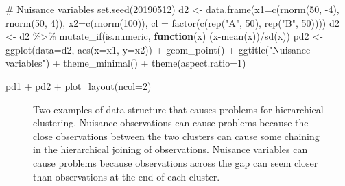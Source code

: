 \documentclass[
  letterpaper,
]{krantz}
\newenvironment{Shaded}{\begin{snugshade}}{\end{snugshade}}
\newcommand{\AttributeTok}[1]{\textcolor[rgb]{0.40,0.45,0.13}{#1}}
\newcommand{\CommentTok}[1]{\textcolor[rgb]{0.37,0.37,0.37}{#1}}
\newcommand{\ControlFlowTok}[1]{\textcolor[rgb]{0.00,0.23,0.31}{\textbf{#1}}}
\newcommand{\DecValTok}[1]{\textcolor[rgb]{0.68,0.00,0.00}{#1}}
\newcommand{\FunctionTok}[1]{\textcolor[rgb]{0.28,0.35,0.67}{#1}}
\newcommand{\NormalTok}[1]{\textcolor[rgb]{0.00,0.23,0.31}{#1}}
\newcommand{\OtherTok}[1]{\textcolor[rgb]{0.00,0.23,0.31}{#1}}
\newcommand{\SpecialCharTok}[1]{\textcolor[rgb]{0.37,0.37,0.37}{#1}}
\newcommand{\StringTok}[1]{\textcolor[rgb]{0.13,0.47,0.30}{#1}}
\begin{document}
\begin{Shaded}
\begin{Highlighting}[]
\CommentTok{\# Nuisance variables}
\FunctionTok{set.seed}\NormalTok{(}\DecValTok{20190512}\NormalTok{)}
\NormalTok{d2 }\OtherTok{\textless{}{-}} \FunctionTok{data.frame}\NormalTok{(}\AttributeTok{x1=}\FunctionTok{c}\NormalTok{(}\FunctionTok{rnorm}\NormalTok{(}\DecValTok{50}\NormalTok{, }\SpecialCharTok{{-}}\DecValTok{4}\NormalTok{), }
                            \FunctionTok{rnorm}\NormalTok{(}\DecValTok{50}\NormalTok{, }\DecValTok{4}\NormalTok{)),}
                 \AttributeTok{x2=}\FunctionTok{c}\NormalTok{(}\FunctionTok{rnorm}\NormalTok{(}\DecValTok{100}\NormalTok{)),}
                 \AttributeTok{cl =} \FunctionTok{factor}\NormalTok{(}\FunctionTok{c}\NormalTok{(}\FunctionTok{rep}\NormalTok{(}\StringTok{"A"}\NormalTok{, }\DecValTok{50}\NormalTok{), }
                             \FunctionTok{rep}\NormalTok{(}\StringTok{"B"}\NormalTok{, }\DecValTok{50}\NormalTok{))))}
\NormalTok{d2 }\OtherTok{\textless{}{-}}\NormalTok{ d2 }\SpecialCharTok{\%\textgreater{}\%} 
  \FunctionTok{mutate\_if}\NormalTok{(is.numeric, }\ControlFlowTok{function}\NormalTok{(x) (x}\SpecialCharTok{{-}}\FunctionTok{mean}\NormalTok{(x))}\SpecialCharTok{/}\FunctionTok{sd}\NormalTok{(x))}
\NormalTok{pd2 }\OtherTok{\textless{}{-}} \FunctionTok{ggplot}\NormalTok{(}\AttributeTok{data=}\NormalTok{d2, }\FunctionTok{aes}\NormalTok{(}\AttributeTok{x=}\NormalTok{x1, }\AttributeTok{y=}\NormalTok{x2)) }\SpecialCharTok{+} 
  \FunctionTok{geom\_point}\NormalTok{() }\SpecialCharTok{+}
    \FunctionTok{ggtitle}\NormalTok{(}\StringTok{"Nuisance variables"}\NormalTok{) }\SpecialCharTok{+} 
  \FunctionTok{theme\_minimal}\NormalTok{() }\SpecialCharTok{+}
    \FunctionTok{theme}\NormalTok{(}\AttributeTok{aspect.ratio=}\DecValTok{1}\NormalTok{)}

\NormalTok{pd1 }\SpecialCharTok{+}\NormalTok{ pd2 }\SpecialCharTok{+} \FunctionTok{plot\_layout}\NormalTok{(}\AttributeTok{ncol=}\DecValTok{2}\NormalTok{)}
\end{Highlighting}
\end{Shaded}

\begin{figure}[H]


\caption{\label{fig-problems}Two examples of data structure that causes
problems for hierarchical clustering. Nuisance observations can cause
problems because the close observations between the two clusters can
cause some chaining in the hierarchical joining of observations.
Nuisance variables can cause problems because observations across the
gap can seem closer than observations at the end of each cluster.}

\end{figure}%
\end{document}
